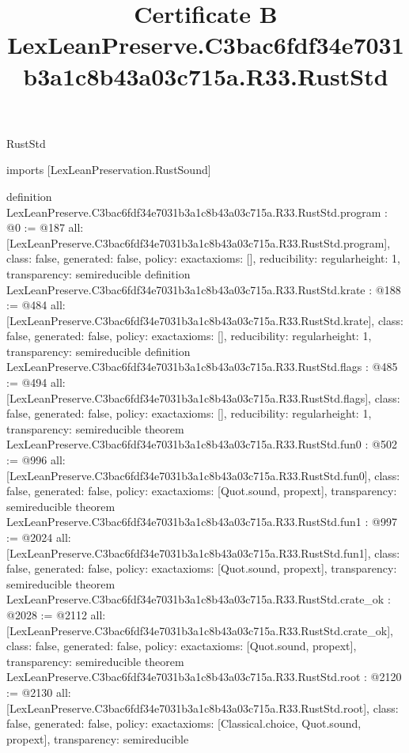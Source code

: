 \begin{lexlean}{RustStd}
\title{Certificate B LexLeanPreserve.C3bac6fdf34e7031b3a1c8b43a03c715a.R33.RustStd}
\begin{coremodule}
imports [LexLeanPreservation.RustSound]

definition LexLeanPreserve.C3bac6fdf34e7031b3a1c8b43a03c715a.R33.RustStd.program : @0 := @187 {
  all: [LexLeanPreserve.C3bac6fdf34e7031b3a1c8b43a03c715a.R33.RustStd.program],
  class: false,
  generated: false,
  policy: exact{axioms: []},
  reducibility: regular{height: 1},
  transparency: semireducible
}
definition LexLeanPreserve.C3bac6fdf34e7031b3a1c8b43a03c715a.R33.RustStd.krate : @188 := @484 {
  all: [LexLeanPreserve.C3bac6fdf34e7031b3a1c8b43a03c715a.R33.RustStd.krate],
  class: false,
  generated: false,
  policy: exact{axioms: []},
  reducibility: regular{height: 1},
  transparency: semireducible
}
definition LexLeanPreserve.C3bac6fdf34e7031b3a1c8b43a03c715a.R33.RustStd.flags : @485 := @494 {
  all: [LexLeanPreserve.C3bac6fdf34e7031b3a1c8b43a03c715a.R33.RustStd.flags],
  class: false,
  generated: false,
  policy: exact{axioms: []},
  reducibility: regular{height: 1},
  transparency: semireducible
}
theorem LexLeanPreserve.C3bac6fdf34e7031b3a1c8b43a03c715a.R33.RustStd.fun0 : @502 := @996 {
  all: [LexLeanPreserve.C3bac6fdf34e7031b3a1c8b43a03c715a.R33.RustStd.fun0],
  class: false,
  generated: false,
  policy: exact{axioms: [Quot.sound, propext]},
  transparency: semireducible
}
theorem LexLeanPreserve.C3bac6fdf34e7031b3a1c8b43a03c715a.R33.RustStd.fun1 : @997 := @2024 {
  all: [LexLeanPreserve.C3bac6fdf34e7031b3a1c8b43a03c715a.R33.RustStd.fun1],
  class: false,
  generated: false,
  policy: exact{axioms: [Quot.sound, propext]},
  transparency: semireducible
}
theorem LexLeanPreserve.C3bac6fdf34e7031b3a1c8b43a03c715a.R33.RustStd.crate_ok : @2028 := @2112 {
  all: [LexLeanPreserve.C3bac6fdf34e7031b3a1c8b43a03c715a.R33.RustStd.crate_ok],
  class: false,
  generated: false,
  policy: exact{axioms: [Quot.sound, propext]},
  transparency: semireducible
}
theorem LexLeanPreserve.C3bac6fdf34e7031b3a1c8b43a03c715a.R33.RustStd.root : @2120 := @2130 {
  all: [LexLeanPreserve.C3bac6fdf34e7031b3a1c8b43a03c715a.R33.RustStd.root],
  class: false,
  generated: false,
  policy: exact{axioms: [Classical.choice, Quot.sound, propext]},
  transparency: semireducible
}


\end{coremodule}
\end{lexlean}
